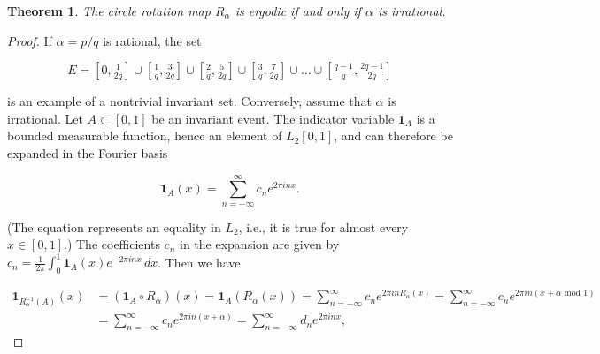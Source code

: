 \documentclass[11pt]{report}
\theoremstyle{plain}
\newtheorem{thm}{Theorem}[chapter]
\theoremstyle{definition}
\begin{document}
\begin{enumerate}[label=\arabic*.]
\begin{thm}
The circle rotation map $R_\alpha$ is ergodic if and only if $\alpha$ is irrational.
\end{thm}

\begin{proof}
If $\alpha=p/q$ is rational, the set

\[
E = \left[0, \tfrac{1}{2q}\right]
\cup \left[\tfrac{1}{q}, \tfrac{3}{2q}\right]
\cup \left[\tfrac{2}{q}, \tfrac{5}{2q}\right]
\cup \left[\tfrac{3}{q}, \tfrac{7}{2q}\right]
\cup \ldots
\cup \left[\tfrac{q-1}{q}, \tfrac{2q-1}{2q}\right]
\]

is an example of a nontrivial invariant set. Conversely, assume that $\alpha$ is irrational. Let $A \subset [0,1]$ be an invariant event. The indicator variable $\mathbf{1}_A$ is a bounded measurable function, hence an element of $L_2[0,1]$, and can therefore be expanded in the Fourier basis

\[
\mathbf{1}_A(x) = \sum_{n=-\infty}^\infty c_n e^{2\pi inx}.
\]

(The equation represents an equality in $L_2$, i.e., it is true for almost every $x\in [0,1]$.) The coefficients $c_n$ in the expansion are given by $c_n = \frac{1}{2\pi} \int_0^1 \mathbf{1}_A(x) e^{-2\pi i n x}\,dx$. Then we have

\begin{align*}
\mathbf{1}_{R_\alpha^{-1}(A)}(x) &= (\mathbf{1}_A\circ R_\alpha)(x) = \mathbf{1}_A(R_\alpha(x))
= \sum_{n=-\infty}^\infty c_n e^{2\pi i n R_\alpha(x)}
= \sum_{n=-\infty}^\infty c_n e^{2\pi i n (x+\alpha\textrm{ mod }1)} \\
&
= \sum_{n=-\infty}^\infty c_n e^{2\pi i n (x+\alpha)}
= \sum_{n=-\infty}^\infty d_n  e^{2\pi i n x},
\end{align*}


\end{proof}
\end{enumerate}
\end{document}
